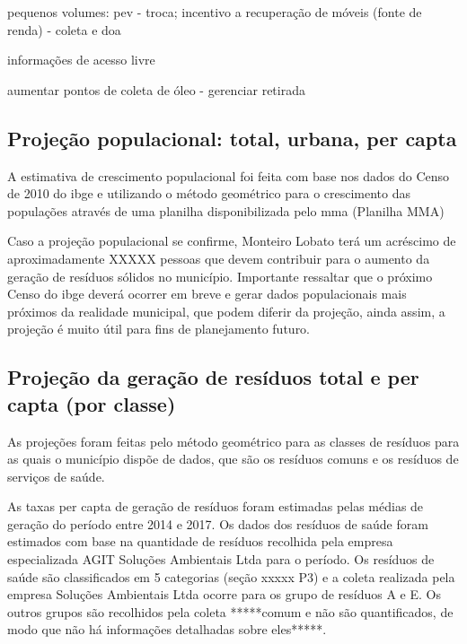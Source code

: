 pequenos volumes: pev - troca; incentivo a recuperação de móveis (fonte de renda) - coleta e doa

informações de acesso livre

aumentar pontos de coleta de óleo - gerenciar retirada
\subsection{Projeção populacional: total, urbana, per capta}

A estimativa de crescimento populacional foi feita com base nos dados do Censo de 2010 do \gls{ibge} e utilizando o método geométrico para o crescimento das populações através de uma planilha disponibilizada pelo \gls{mma} (Planilha MMA)  %



Caso a projeção populacional se confirme, Monteiro Lobato terá um acréscimo de aproximadamente XXXXX pessoas que devem contribuir para o aumento da geração de resíduos sólidos no município. Importante ressaltar que o próximo Censo do \gls{ibge} deverá ocorrer em breve e gerar dados populacionais mais próximos da realidade municipal, que podem diferir da projeção, ainda assim, a projeção é muito útil para fins de planejamento futuro.

\subsection{Projeção da geração de resíduos total e per capta (por classe)}

As projeções foram feitas pelo método geométrico para as classes de resíduos para as quais o município dispõe de dados, que são os resíduos comuns e os resíduos de serviços de saúde. 

%

As taxas per capta de geração de resíduos foram estimadas pelas médias de geração do período entre 2014 e 2017. Os dados dos resíduos de saúde foram estimados com base na quantidade de resíduos recolhida pela empresa especializada AGIT Soluções Ambientais Ltda para o período. Os resíduos de saúde são classificados em 5 categorias (seção xxxxx P3) e a coleta realizada pela empresa Soluções Ambientais Ltda ocorre para os grupo de resíduos A e E. Os outros grupos são recolhidos pela coleta *****comum e não são quantificados, de modo que não há informações detalhadas sobre eles*****.

